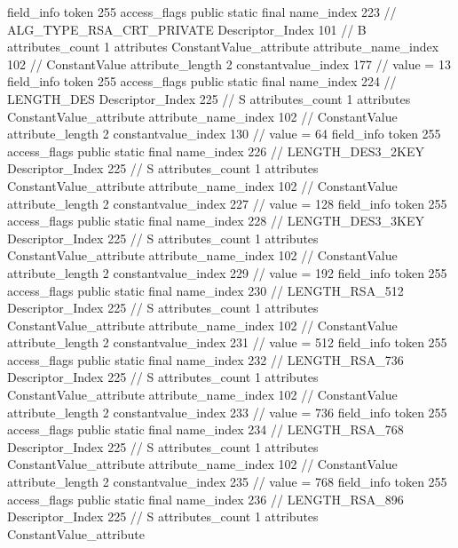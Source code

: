 {{{{{{{				}
				}
			}
			field_info {
				token	255
				access_flags	public static final
				name_index	223		// ALG_TYPE_RSA_CRT_PRIVATE
				Descriptor_Index	101		// B
				attributes_count	1
				attributes {
				ConstantValue_attribute {
					attribute_name_index	102		// ConstantValue
					attribute_length	2
					constantvalue_index	177		// value = 13
				}
				}
			}
			field_info {
				token	255
				access_flags	public static final
				name_index	224		// LENGTH_DES
				Descriptor_Index	225		// S
				attributes_count	1
				attributes {
				ConstantValue_attribute {
					attribute_name_index	102		// ConstantValue
					attribute_length	2
					constantvalue_index	130		// value = 64
				}
				}
			}
			field_info {
				token	255
				access_flags	public static final
				name_index	226		// LENGTH_DES3_2KEY
				Descriptor_Index	225		// S
				attributes_count	1
				attributes {
				ConstantValue_attribute {
					attribute_name_index	102		// ConstantValue
					attribute_length	2
					constantvalue_index	227		// value = 128
				}
				}
			}
			field_info {
				token	255
				access_flags	public static final
				name_index	228		// LENGTH_DES3_3KEY
				Descriptor_Index	225		// S
				attributes_count	1
				attributes {
				ConstantValue_attribute {
					attribute_name_index	102		// ConstantValue
					attribute_length	2
					constantvalue_index	229		// value = 192
				}
				}
			}
			field_info {
				token	255
				access_flags	public static final
				name_index	230		// LENGTH_RSA_512
				Descriptor_Index	225		// S
				attributes_count	1
				attributes {
				ConstantValue_attribute {
					attribute_name_index	102		// ConstantValue
					attribute_length	2
					constantvalue_index	231		// value = 512
				}
				}
			}
			field_info {
				token	255
				access_flags	public static final
				name_index	232		// LENGTH_RSA_736
				Descriptor_Index	225		// S
				attributes_count	1
				attributes {
				ConstantValue_attribute {
					attribute_name_index	102		// ConstantValue
					attribute_length	2
					constantvalue_index	233		// value = 736
				}
				}
			}
			field_info {
				token	255
				access_flags	public static final
				name_index	234		// LENGTH_RSA_768
				Descriptor_Index	225		// S
				attributes_count	1
				attributes {
				ConstantValue_attribute {
					attribute_name_index	102		// ConstantValue
					attribute_length	2
					constantvalue_index	235		// value = 768
				}
				}
			}
			field_info {
				token	255
				access_flags	public static final
				name_index	236		// LENGTH_RSA_896
				Descriptor_Index	225		// S
				attributes_count	1
				attributes {
				ConstantValue_attribute {
}}}}}}}
